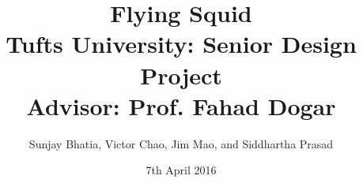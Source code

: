 \documentclass {article}
\title {
	{Flying Squid\\[0.4in]}
	{Tufts University: Senior Design Project\\[0.2in]}
	{\large Advisor: Prof. Fahad Dogar\\}
}
\author {Sunjay Bhatia, Victor Chao, Jim Mao, and Siddhartha Prasad}
\date{7th April 2016}
\begin{document}
\maketitle

\tableofcontents
\pagebreak









\printbibliography
\end{document}
